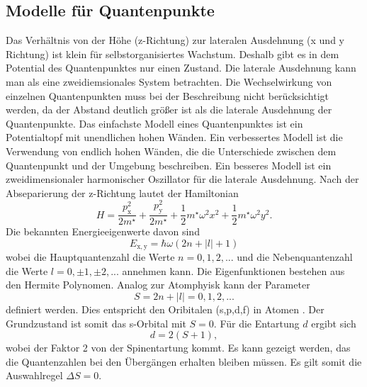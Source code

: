 \subsection{Modelle für Quantenpunkte}
Das Verhältnis von der Höhe (z-Richtung) zur lateralen Ausdehnung  (x und y Richtung) ist klein für selbstorganisiertes Wachstum. Deshalb gibt es in dem Potential des Quantenpunktes nur einen Zustand. Die laterale Ausdehnung kann man als eine zweidiemsionales System betrachten. Die Wechselwirkung von einzelnen Quantenpunkten muss bei der Beschreibung nicht berücksichtigt werden, da der Abstand deutlich grö{\ss}er ist als die laterale Ausdehnung der Quantenpunkte. 
Das einfachste Modell eines Quantenpunktes ist ein Potentialtopf mit unendlichen hohen Wänden. Ein verbessertes Modell ist die Verwendung von endlich hohen Wänden, die die Unterschiede zwischen dem Quantenpunkt und der Umgebung beschreiben. Ein besseres Modell ist ein zweidimensionaler harmonischer Oszillator \cite{Nolting} für die laterale Ausdehnung. Nach der Abseparierung der z-Richtung lautet der Hamiltonian
\begin{equation}  
H = \frac{p_\mathrm{x}^2}{2 m^\star} + \frac{p_\mathrm{y}^2}{2 m^\star} + \frac{1}{2} m^\star \omega^2 x^2 + \frac{1}{2} m^\star \omega^2 y^2. 
\end{equation} 
Die bekannten Energieeigenwerte davon sind 
\begin{equation}
E_{\mathrm{x,y}} = \hbar \omega (2n +|l| +1)
\end{equation}
wobei die Hauptquantenzahl die Werte $n = 0,1,2, ...$ und die Nebenquantenzahl die Werte $l = 0, \pm1, \pm2, ...$ annehmen kann. 
Die Eigenfunktionen bestehen aus den Hermite Polynomen. Analog zur Atomphyisk kann der Parameter 
\begin{equation}
S = 2n +|l| = 0,1,2, ...
\end{equation}
definiert werden. Dies entspricht den Oribitalen (s,p,d,f) in Atomen \cite{Haken_Wolf}. 
Der Grundzustand ist somit das s-Orbital mit $S = 0$. 
Für die Entartung $d$ ergibt sich 
\begin{equation}
d = 2(S+1),
\end{equation}
wobei der Faktor 2 von der Spinentartung kommt. Es kann gezeigt werden, das die Quantenzahlen bei den Übergängen erhalten bleiben müssen.  Es gilt somit die Auswahlregel $\Delta S =0$. 
